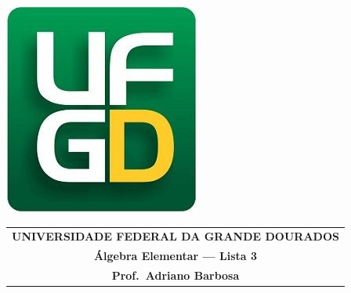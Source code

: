 \documentclass[a4paper,5pt]{amsbook}
\begin{document}
\thispagestyle{empty}
\pagestyle{empty}
\begin{minipage}[h]{0.14\textwidth}
	\includegraphics[scale=0.24]{../ufgd.png}
\end{minipage}
\begin{minipage}[h]{\textwidth}
\begin{tabular}{c}
{{\bf UNIVERSIDADE FEDERAL DA GRANDE DOURADOS}}\\
{{\bf \'Algebra Elementar --- Lista 3}}\\
{{\bf Prof.\ Adriano Barbosa}}\\
\end{tabular}
\vspace{-0.45cm}
%
\end{minipage}

\end{document}

